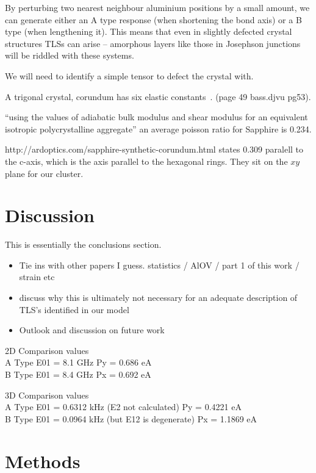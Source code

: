 By perturbing two nearest neighbour aluminium positions by a small amount, we can generate either an A type response (when shortening the bond axis) or a B type (when lengthening it). This means that even in slightly defected crystal structures TLSs can arise -- amorphous layers like those in Josephson junctions will be riddled with these systems.

We will need to identify a simple tensor to defect the crystal with.


A trigonal crystal, corundum has six elastic constants~\cite{Bass1995}. (page 49 bass.djvu pg53).

``using the values of adiabatic bulk modulus and shear modulus for an equivalent isotropic polycrystalline aggregate'' an average poisson ratio for Sapphire is 0.234\cite{Gercek2007}.

http://ardoptics.com/sapphire-synthetic-corundum.html states 0.309 paralell to the c-axis, which is the axis parallel to the hexagonal rings. They sit on the $xy$ plane for our cluster.
\section{Discussion}

This is essentially the conclusions section.

\begin{itemize}
    \item Tie ins with other papers I guess. statistics / AlOV / part 1 of this work / strain etc
    \item discuss why this is ultimately not necessary for an adequate description of TLS's identified in our model
    \item Outlook and discussion on future work
\end{itemize}

2D Comparison values\\
A Type E01 = 8.1 GHz Py = 0.686 eA\\
B Type E01 = 8.4 GHz Px = 0.692 eA

3D Comparison values\\
A Type E01 = 0.6312 kHz (E2 not calculated) Py = 0.4221 eA\\
B Type E01 = 0.0964 kHz (but E12 is degenerate) Px = 1.1869 eA

\section{Methods}\label{sec:methods}

